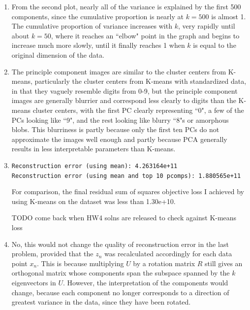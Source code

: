 \documentclass[submit]{harvardml}
\newcommand{\TODO}{{\color{red}TODO }}
\begin{document}
\begin{enumerate}
  \item From the second plot, nearly all of the variance is explained by the first 500 components, since the cumulative proportion is nearly at $k=500$ is almost 1. The cumulative proportion of variance increases with $k$, very rapidly until about $k=50$, where it reaches an ``elbow" point in the graph and begins to increase much more slowly, until it finally reaches 1 when $k$ is equal to the original dimension of the data.

  \item The principle component images are similar to the cluster centers from K-means, particularly the cluster centers from K-means with standardized data, in that they vaguely resemble digits from 0-9, but the principle component images are generally blurrier and correspond less clearly to digits than the K-means cluster centers, with the first PC clearly representing ``0", a few of the PCs looking like ``9", and the rest looking like blurry ``8"s or amorphous blobs. This blurriness is partly because only the first ten PCs do not approximate the images well enough and partly because PCA generally results in less interpretable parameters than K-means.

  \item
  \texttt{Reconstruction error (using mean): 4.263164e+11 \\
  	Reconstruction error (using mean and top 10 pcomps): 1.880565e+11}

  For comparison, the final residual sum of squares objective loss I achieved by using K-means on the dataset was less than 1.30e+10.
  
  \TODO come back when HW4 solns are released to check against K-means loss

  \item No, this would not change the quality of reconstruction error in the last problem, provided that the $z_n$ was recalculated accordingly for each data point $x_n$. This is because multiplying $U$ by a rotation matrix $R$ still gives an orthogonal matrix whose components span the subspace spanned by the $k$ eigenvectors in $U$. However, the interpretation of the components would change, because each component no longer corresponds to a direction of greatest variance in the data, since they have been rotated.
\end{enumerate}

\newpage
\end{document}
